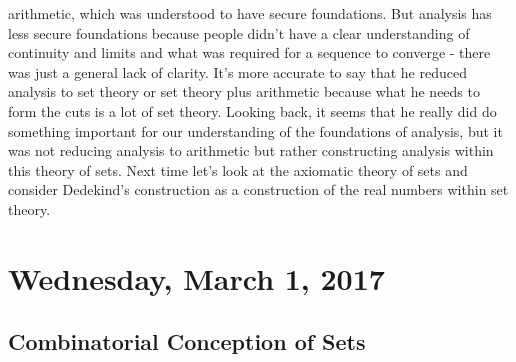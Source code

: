 \documentclass[12pt]{article}
\theoremstyle{definition}
\begin{document}
\begin{itemize}
        arithmetic, which was understood to have secure foundations. But
        analysis has less secure foundations because people didn't have a clear
        understanding of continuity and limits and what was required for a
        sequence to converge - there was just a general lack of clarity. It's
        more accurate to say that he reduced analysis to set theory or set
        theory plus arithmetic because what he needs to form the cuts is a lot
        of set theory. Looking back, it seems that he really did do something
        important for our understanding of the foundations of analysis, but it
        was not reducing analysis to arithmetic but rather constructing
        analysis within this theory of sets. Next time let's look at the
        axiomatic theory of sets and consider Dedekind's construction as a
        construction of the real numbers within set theory.

\end{itemize}

\section{Wednesday, March 1, 2017}

\subsection{Combinatorial Conception of Sets}
\end{document}
